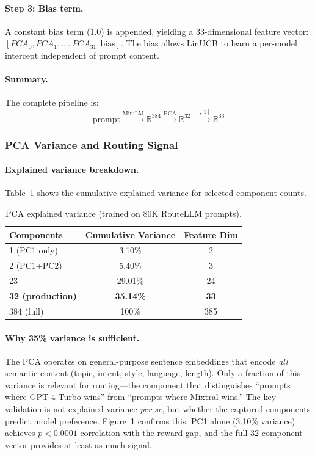 \paragraph{Step 3: Bias term.}
A constant bias term (1.0) is appended, yielding a 33-dimensional feature
vector: $[PCA_0, PCA_1, \ldots, PCA_{31}, \text{bias}]$.  The bias allows
LinUCB to learn a per-model intercept independent of prompt content.

\paragraph{Summary.}
The complete pipeline is:
\begin{equation}
\text{prompt} \xrightarrow{\text{MiniLM}} \mathbb{R}^{384}
\xrightarrow{\text{PCA}} \mathbb{R}^{32}
\xrightarrow{[\cdot\,;\, 1]} \mathbb{R}^{33}
\label{eq:feature_pipeline}
\end{equation}

\subsubsection{PCA Variance and Routing Signal}

\paragraph{Explained variance breakdown.}
Table~\ref{tab:pca_variance} shows the cumulative explained variance for
selected component counts.

\begin{table}[h]
\centering
\caption{PCA explained variance (trained on 80K RouteLLM prompts).}
\label{tab:pca_variance}
\small
\begin{tabular}{lcc}
\toprule
\textbf{Components} & \textbf{Cumulative Variance} & \textbf{Feature Dim} \\
\midrule
1 (PC1 only) & 3.10\% & 2 \\
2 (PC1+PC2) & 5.40\% & 3 \\
23 & 29.01\% & 24 \\
\textbf{32 (production)} & \textbf{35.14\%} & \textbf{33} \\
384 (full) & 100\% & 385 \\
\bottomrule
\end{tabular}
\end{table}

\paragraph{Why 35\% variance is sufficient.}
The PCA operates on general-purpose sentence embeddings that encode
\emph{all} semantic content (topic, intent, style, language, length).
Only a fraction of this variance is relevant for routing---the component
that distinguishes ``prompts where GPT-4-Turbo wins'' from ``prompts where
Mixtral wins.''  The key validation is not explained variance \emph{per se},
but whether the captured components predict model preference.  Figure~1
confirms this: PC1 alone (3.10\% variance) achieves $p < 0.0001$ correlation
with the reward gap, and the full 32-component vector provides at least as
much signal.

